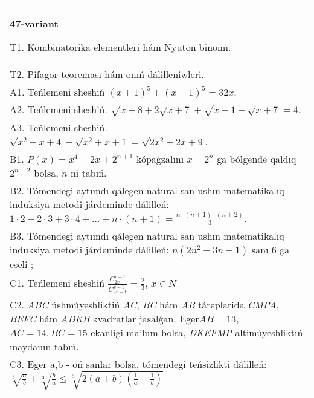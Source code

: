 \documentclass{article}
\begin{document}
\begin{tabular}{m{17cm}}
\textbf{47-variant}
\newline

T1. Kombinatorika elementleri hám Nyuton binomı. \\
T2. Pifagor teoreması hám onıń dálilleniwleri. \\
A1. Teńlemeni sheshiń \((x + 1)^{5} + (x - 1)^{5} = 32x\). \\
A2. Teńlemeni sheshiń. \(\sqrt{x + 8 + 2\sqrt{x + 7}} + \sqrt{x + 1 - \sqrt{x + 7}} = 4\). \\
A3. Teńlemeni sheshiń. \(\sqrt{x^{2} + x + 4} + \sqrt{x^{2} + x + 1} = \sqrt{2x^{2} + 2x + 9}\). \\
B1. \(P(x) = x^{4} - 2x + 2^{n + 1}\) kópaǵzalını \(x - 2^{n}\) ga bólgende qaldıq \(2^{n - 2}\) bolsa, \(n\) ni tabıń. \\
B2. Tómendegi aytımdı qálegen natural san ushın matematikalıq induksiya metodi járdeminde dálilleń: \(1 \cdot 2 + 2 \cdot 3 + 3 \cdot 4 + \ldots + n \cdot (n + 1) = \frac{n \cdot (n + 1) \cdot (n + 2)}{3}\). \\
B3. Tómendegi aytımdı qálegen natural san ushın matematikalıq induksiya metodi járdeminde dálilleń: \(n\left( 2n^{2} - 3n + 1 \right)\) sanı 6 ga eseli ; \\
C1. Teńlemeni sheshiń \(\frac{C_{2x}^{x + 1}}{C_{2x + 1}^{x - 1}} = \frac{2}{3}\), \(x \in N\) \\
C2. \emph{ABC} úshmúyeshliktiń \emph{AC}, \emph{BC} hám \emph{AB} táreplarida \emph{CMPA}, \emph{BEFC} hám \emph{ADKB} kvadratlar jasalǵan. Eger\(AB = 13\), \(AC = 14,BC = 15\) ekanligi ma'lum bolsa, \emph{DKEFMP} altimúyeshliktıń maydanın tabıń. \\
C3. Eger a,b - oń sanlar bolsa, tómendegi teńsizlikti dálilleń: \(\sqrt[3]{\frac{a}{b}} + \sqrt[3]{\frac{b}{a}} \leq \sqrt[3]{2(a + b)\left( \frac{1}{a} + \frac{1}{b} \right)}\) \\

\end{tabular}
\vspace{1cm}
\end{document}
